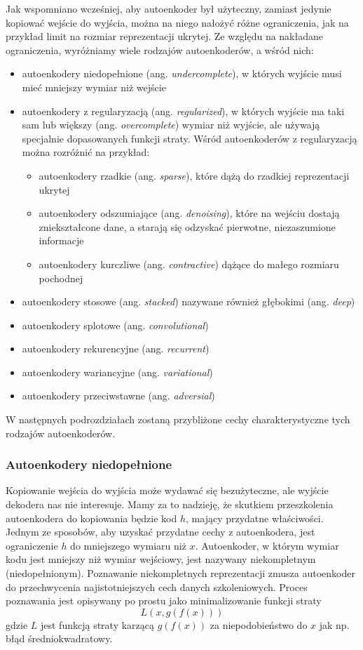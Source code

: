 \documentclass[12pt]{mwbk}
\theoremstyle{plain}
\theoremstyle{definition}
\theoremstyle{remark}
\begin{document}
Jak wspomniano wcześniej, aby autoenkoder był użyteczny, zamiast jedynie kopiować wejście do wyjścia, można na niego nałożyć różne ograniczenia, jak na przykład limit na rozmiar reprezentacji ukrytej. Ze względu na nakładane ograniczenia, wyróżniamy wiele rodzajów autoenkoderów, a wśród nich:
\begin{itemize}
	\item  autoenkodery niedopełnione (ang. \emph{undercomplete}), w których wyjście musi mieć mniejszy wymiar niż wejście
 \item autoenkodery z regularyzacją (ang. \emph{regularized}), w których wyjście ma taki sam lub większy (ang. \emph{overcomplete}) wymiar niż wyjście, ale używają specjalnie dopasowanych funkcji straty. Wśród autoenkoderów z regularyzacją można rozróżnić na przykład:
 \begin{itemize}
 	\item autoenkodery rzadkie (ang. \emph{sparse}), które dążą do rzadkiej reprezentacji ukrytej
 	\item autoenkodery odszumiające (ang. \emph{denoising}), które na wejściu dostają zniekształcone dane, a starają się odzyskać pierwotne, niezaszumione informacje
 	\item autoenkodery kurczliwe (ang. \emph{contractive}) dążące do małego rozmiaru pochodnej
 \end{itemize}
\item autoenkodery stosowe (ang. \emph{stacked}) nazywane również głębokimi (ang. \emph{deep})
\item autoenkodery splotowe (ang. \emph{convolutional})
\item autoenkodery rekurencyjne (ang. \emph{recurrent})
\item autoenkodery wariancyjne (ang. \emph{variational})
\item autoenkodery przeciwstawne (ang. \emph{adversial})
\end{itemize}
W następnych podrozdziałach zostaną przybliżone cechy charakterystyczne tych rodzajów autoenkoderów.

\subsubsection{Autoenkodery niedopełnione}

Kopiowanie wejścia do wyjścia może wydawać się bezużyteczne, ale wyjście dekodera nas nie interesuje. Mamy za to nadzieję, że skutkiem przeszkolenia autoenkodera do kopiowania będzie kod $h$, mający przydatne właściwości.
Jednym ze sposobów, aby uzyskać przydatne cechy z autoenkodera, jest ograniczenie $h$ do mniejszego wymiaru niż $x$. Autoenkoder, w którym wymiar kodu jest mniejszy niż wymiar wejściowy, jest nazywany niekompletnym (niedopełnionym).
Poznawanie niekompletnych reprezentacji zmusza autoenkoder do przechwycenia najistotniejszych cech danych szkoleniowych.
Proces poznawania jest opisywany po prostu jako minimalizowanie funkcji straty
$$L(x, g(f(x)))$$
gdzie $L$ jest funkcją straty karzącą $g(f(x))$ za niepodobieństwo do $x$ jak np. błąd średniokwadratowy.
\end{document}

